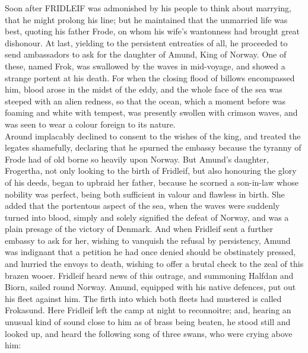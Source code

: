 \documentclass[10pt,a4paper]{report}
\begin{document}
Soon after FRIDLEIF was admonished by his people to think about marrying, that he might prolong his line; but he maintained that the unmarried life was best, quoting his father Frode, on whom his wife's wantonness had brought great dishonour. At last, yielding to the persistent entreaties of all, he proceeded to send ambassadors to ask for the daughter of Amund, King of Norway. One of these, named Frok, was swallowed by the waves in mid-voyage, and showed a strange portent at his death. For when the closing flood of billows encompassed him, blood arose in the midst of the eddy, and the whole face of the sea was steeped with an alien redness, so that the ocean, which a moment before was foaming and white with tempest, was presently swollen with crimson waves, and was seen to wear a colour foreign to its nature.\\

Around implacably declined to consent to the wishes of the king, and treated the legates shamefully, declaring that he spurned the embassy because the tyranny of Frode had of old borne so heavily upon Norway. But Amund's daughter, Frogertha, not only looking to the birth of Fridleif, but also honouring the glory of his deeds, began to upbraid her father, because he scorned a son-in-law whose nobility was perfect, being both sufficient in valour and flawless in birth. She added that the portentous aspect of the sea, when the waves were suddenly turned into blood, simply and solely signified the defeat of Norway, and was a plain presage of the victory of Denmark. And when Fridleif sent a further embassy to ask for her, wishing to vanquish the refusal by persistency, Amund was indignant that a petition he had once denied should be obstinately pressed, and hurried the envoys to death, wishing to offer a brutal check to the zeal of this brazen wooer. Fridleif heard news of this outrage, and summoning Halfdan and Biorn, sailed round Norway. Amund, equipped with his native defences, put out his fleet against him. The firth into which both fleets had mustered is called Frokasund. Here Fridleif left the camp at night to reconnoitre; and, hearing an unusual kind of sound close to him as of brass being beaten, he stood still and looked up, and heard the following song of three swans, who were crying above him:\\
\end{document}
